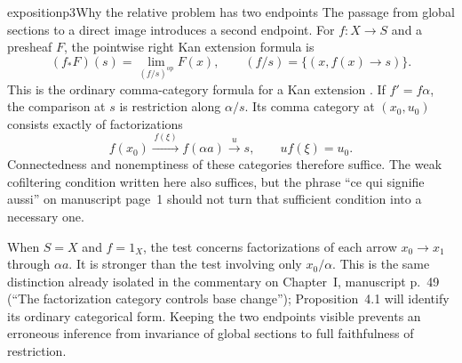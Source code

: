 \begin{dcomment}{exposition}{p3}{Why the relative problem has two endpoints}
The passage from global sections to a direct image introduces a second endpoint. For $f:X\to S$ and a presheaf $F$, the pointwise right Kan extension formula is
\[
 (f_*F)(s)=\lim_{(f/s)^{\mathrm{op}}}F(x),
 \qquad (f/s)=\{(x,f(x)\to s)\}.
\]
This is the ordinary comma-category formula for a Kan extension \citep[Theorem~6.2.1 and Corollary~6.2.9]{Riehl2016}. If $f'=f\alpha$, the comparison at $s$ is restriction along $\alpha/s$. Its comma category at $(x_0,u_0)$ consists exactly of factorizations
\[
 f(x_0)\xrightarrow{\,f(\xi)\,}f(\alpha a)
 \xrightarrow{\,u\,}s,
 \qquad u f(\xi)=u_0.
\]
Connectedness and nonemptiness of these categories therefore suffice. The weak cofiltering condition written here also suffices, but the phrase ``ce qui signifie aussi'' on manuscript page~1 should not turn that sufficient condition into a necessary one.

When $S=X$ and $f=1_X$, the test concerns factorizations of each arrow $x_0\to x_1$ through $\alpha a$. It is stronger than the test involving only $x_0/\alpha$. This is the same distinction already isolated in the commentary on Chapter~I, manuscript p.~49 (``The factorization category controls base change''); Proposition~4.1 will identify its ordinary categorical form. Keeping the two endpoints visible prevents an erroneous inference from invariance of global sections to full faithfulness of restriction.
\end{dcomment}

